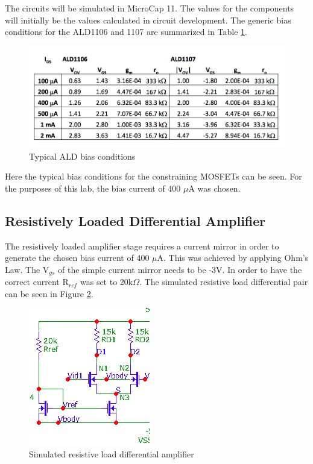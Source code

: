 The circuits will be simulated in MicroCap 11. The values for the components will initially be the values calculated in circuit development. The generic bias conditions for the ALD1106 and 1107 are summarized in Table \ref{tab:bias}. 

\begin{figure}[H]
	\begin{center}
		\includegraphics[scale=.35]{Simulations/nuribias.png}
		\caption{Typical ALD bias conditions \cite{b3}}
		\label{tab:bias}
	\end{center}
\end{figure}

Here the typical bias conditions for the constraining MOSFETs can be seen. For the purposes of this lab, the bias current of 400 $\mu$A was chosen.

\subsection{Resistively Loaded Differential Amplifier}

The resistively loaded amplifier stage requires a current mirror in order to generate the chosen bias current of 400 $\mu$A. This was achieved by applying Ohm's Law. The  V$_{gs}$ of the simple current mirror needs to be -3V. In order to  have the correct  current R$_{ref}$ was set to 20k$\Omega$. The simulated resistive load differential pair can be seen in Figure \ref{fig:ResLoadSim}.
\begin{figure}[H]
    \begin{center}
    \includegraphics[scale=.85]{Simulations/simdiff.png}
    \caption{Simulated resistive load differential amplifier}
    \label{fig:ResLoadSim}
    \end{center}
\end{figure}

